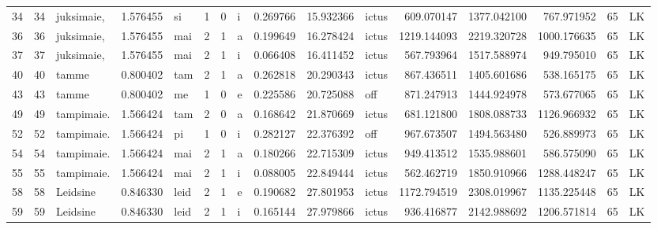 \begin{tabular}{lrlrllllrrlrrrll}
34   &          34 &       juksimaie, &  1.576455 &      si &        1 &      0 &       i &      0.269766 &     15.932366 &  ictus &   609.070147 &  1377.042100 &   767.971952 &     65 &        LK \\
36   &          36 &       juksimaie, &  1.576455 &     mai &        2 &      1 &       a &      0.199649 &     16.278424 &  ictus &  1219.144093 &  2219.320728 &  1000.176635 &     65 &        LK \\
37   &          37 &       juksimaie, &  1.576455 &     mai &        2 &      1 &       i &      0.066408 &     16.411452 &  ictus &   567.793964 &  1517.588974 &   949.795010 &     65 &        LK \\
40   &          40 &            tamme &  0.800402 &     tam &        2 &      1 &       a &      0.262818 &     20.290343 &  ictus &   867.436511 &  1405.601686 &   538.165175 &     65 &        LK \\
43   &          43 &            tamme &  0.800402 &      me &        1 &      0 &       e &      0.225586 &     20.725088 &    off &   871.247913 &  1444.924978 &   573.677065 &     65 &        LK \\
49   &          49 &       tampimaie. &  1.566424 &     tam &        2 &      0 &       a &      0.168642 &     21.870669 &  ictus &   681.121800 &  1808.088733 &  1126.966932 &     65 &        LK \\
52   &          52 &       tampimaie. &  1.566424 &      pi &        1 &      0 &       i &      0.282127 &     22.376392 &    off &   967.673507 &  1494.563480 &   526.889973 &     65 &        LK \\
54   &          54 &       tampimaie. &  1.566424 &     mai &        2 &      1 &       a &      0.180266 &     22.715309 &  ictus &   949.413512 &  1535.988601 &   586.575090 &     65 &        LK \\
55   &          55 &       tampimaie. &  1.566424 &     mai &        2 &      1 &       i &      0.088005 &     22.849444 &  ictus &   562.462719 &  1850.910966 &  1288.448247 &     65 &        LK \\
58   &          58 &         Leidsine &  0.846330 &    leid &        2 &      1 &       e &      0.190682 &     27.801953 &  ictus &  1172.794519 &  2308.019967 &  1135.225448 &     65 &        LK \\
59   &          59 &         Leidsine &  0.846330 &    leid &        2 &      1 &       i &      0.165144 &     27.979866 &  ictus &   936.416877 &  2142.988692 &  1206.571814 &     65 &        LK \\

\end{tabular}
